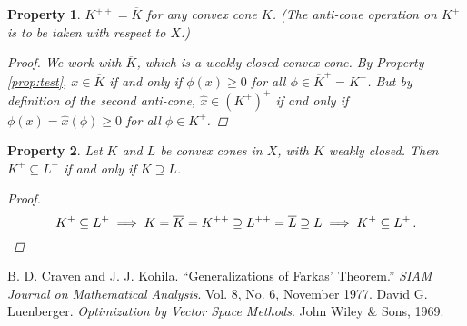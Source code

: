\documentclass[12pt]{article}
\newtheorem{prop}{Property}
\begin{document}
\begin{prop}\label{prop:double}
$K^{++} = \overline{K}$
for any convex cone $K$.  
(The anti-cone operation on $K^+$ is to be taken with respect to
$X$.)
\begin{proof}
We work with $\overline{K}$, which is a weakly-closed convex cone.
By Property \ref{prop:test},
$x \in \overline{K}$ if and only if $\phi(x) \geq 0$ for all $\phi \in 
\overline{K}^+ = K^+$.
But by definition of the second anti-cone,
$\hat{x} \in (K^+)^+$ if and only if 
$\phi(x) = \hat{x}(\phi) \geq 0$ for all $\phi \in K^+$.
\end{proof}
\end{prop}

\begin{prop}\label{prop:equiv}
Let $K$ and $L$ be convex cones in $X$, with $K$ weakly closed.
Then $K^+ \subseteq L^+$ if and only if $K \supseteq L$.
\begin{proof}
\[
K^+ \subseteq L^+ \implies
K = \overline{K} = K^{++} \supseteq L^{++} = \overline{L} \supseteq L \implies
K^+ \subseteq L^+\,. \qedhere
\]
\end{proof}
\end{prop}




\begin{thebibliography}{6}
B. D. Craven and J. J. Kohila.
``Generalizations of Farkas' Theorem.''
\emph{SIAM Journal on Mathematical Analysis}. 
Vol. 8, No. 6, November 1977.
David G. Luenberger. \emph{Optimization by Vector Space Methods}.
John Wiley \& Sons, 1969.
\end{thebibliography}

\end{document}

